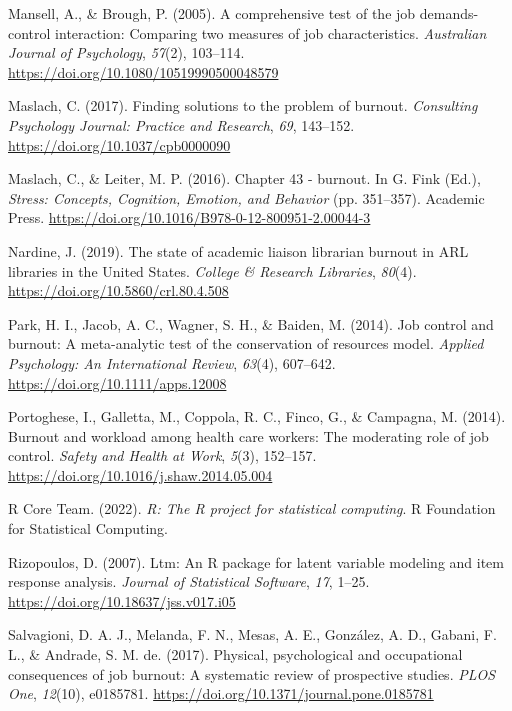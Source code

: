 \documentclass[
  twocolumn]{article}
\newlength{\cslhangindent}
\newenvironment{CSLReferences}[2] %
 {\begin{list}{}{%
  \setlength{\itemindent}{0pt}
  \setlength{\leftmargin}{0pt}
  \setlength{\parsep}{0pt}
  \ifodd #1
   \setlength{\leftmargin}{\cslhangindent}
   \setlength{\itemindent}{-1\cslhangindent}
  \fi
  \setlength{\itemsep}{#2\baselineskip}}}
 {\end{list}}
\begin{document}
\begin{CSLReferences}{1}{0}
Mansell, A., \& Brough, P. (2005). A comprehensive test of the job
demands-control interaction: Comparing two measures of job
characteristics. \emph{Australian Journal of Psychology}, \emph{57}(2),
103--114. \url{https://doi.org/10.1080/10519990500048579}

Maslach, C. (2017). Finding solutions to the problem of burnout.
\emph{Consulting Psychology Journal: Practice and Research}, \emph{69},
143--152. \url{https://doi.org/10.1037/cpb0000090}

Maslach, C., \& Leiter, M. P. (2016). Chapter 43 - burnout. In G. Fink
(Ed.), \emph{Stress: {Concepts}, {Cognition}, {Emotion}, and {Behavior}}
(pp. 351--357). Academic Press.
\url{https://doi.org/10.1016/B978-0-12-800951-2.00044-3}

Nardine, J. (2019). The state of academic liaison librarian burnout in
{ARL} libraries in the {United States}. \emph{College \& Research
Libraries}, \emph{80}(4). \url{https://doi.org/10.5860/crl.80.4.508}

Park, H. I., Jacob, A. C., Wagner, S. H., \& Baiden, M. (2014). Job
control and burnout: A meta-analytic test of the conservation of
resources model. \emph{Applied Psychology: An International Review},
\emph{63}(4), 607--642. \url{https://doi.org/10.1111/apps.12008}

Portoghese, I., Galletta, M., Coppola, R. C., Finco, G., \& Campagna, M.
(2014). Burnout and workload among health care workers: The moderating
role of job control. \emph{Safety and Health at Work}, \emph{5}(3),
152--157. \url{https://doi.org/10.1016/j.shaw.2014.05.004}

R Core Team. (2022). \emph{R: The {R} project for statistical
computing}. R Foundation for Statistical Computing.

Rizopoulos, D. (2007). Ltm: An {R} package for latent variable modeling
and item response analysis. \emph{Journal of Statistical Software},
\emph{17}, 1--25. \url{https://doi.org/10.18637/jss.v017.i05}

Salvagioni, D. A. J., Melanda, F. N., Mesas, A. E., González, A. D.,
Gabani, F. L., \& Andrade, S. M. de. (2017). Physical, psychological and
occupational consequences of job burnout: A systematic review of
prospective studies. \emph{PLOS One}, \emph{12}(10), e0185781.
\url{https://doi.org/10.1371/journal.pone.0185781}


\end{CSLReferences}
\end{document}
